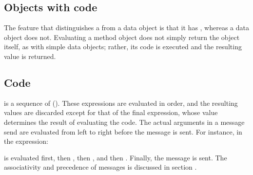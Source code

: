 \documentclass[letterpaper,10pt,english]{sphinxmanual}
\begin{document}

\subsection{Objects with code}
\label{\detokenize{langref:objects-with-code}}\label{\detokenize{langref:index-18}}
The feature that distinguishes a  from a data object is that it has , whereas a data
object does not. Evaluating a method object does not simply return the object itself, as with simple
data objects; rather, its code is executed and the resulting value is returned.


\subsection{Code}
\label{\detokenize{langref:code}}\label{\detokenize{langref:pp-langref-code}}
 is a sequence of  ({\hyperref[\detokenize{langref:pp-langref-expressions}]{}}). These expressions are evaluated in order, and the resulting
values are discarded except for that of the final expression, whose value determines the result
of evaluating the code.
\newpage
The actual arguments in a message send are evaluated from left to right before the message is sent.
For instance, in the expression:

\begin{sphinxVerbatim}[commandchars=\\\{\}]
          \PYG{p}{[}     \PYG{p}{]}
\end{sphinxVerbatim}

 is evaluated first, then , then , and then . Finally, the 
message is sent. The associativity and precedence of messages is discussed in section {\hyperref[\detokenize{langref:langref-expressions}]{}}.

\end{document}
